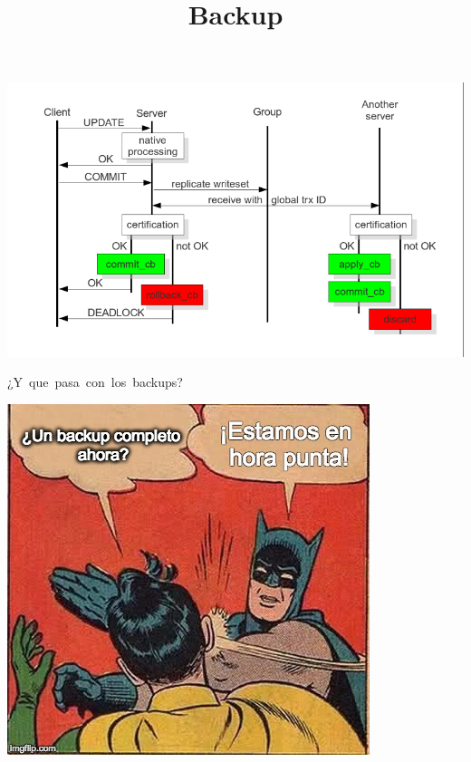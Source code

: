 \documentclass[UTF8]{beamer}
\begin{document}
\begin{frame}
	\includegraphics[width=\textwidth,height=\textheight,keepaspectratio]{images/certificationbasedreplication.png}
\end{frame}





\title[Backup]{Backup}

\begin{frame}
	\centering
	\mbox{¿Y que pasa con los backups?}	
\end{frame}

\begin{frame}
	\centering
	\includegraphics[width=\textwidth,height=\textheight,keepaspectratio]{necesitas_backup}
\end{frame}
\end{document}
